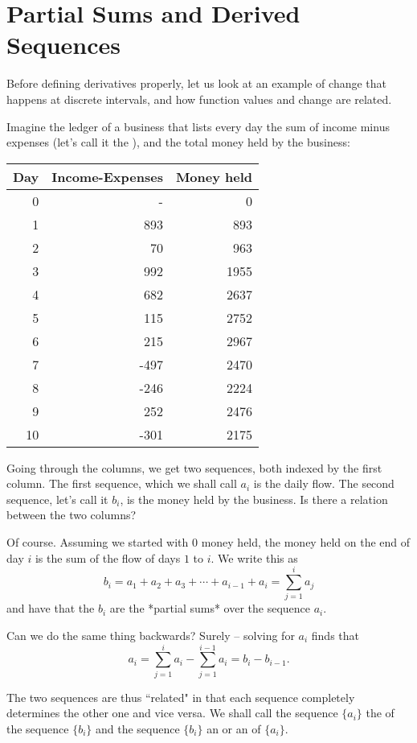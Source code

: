 \section{Partial Sums and Derived Sequences}

Before defining derivatives properly, let us look at an example of change
that happens at discrete intervals, and how function values and change are
related.


Imagine
the ledger of a business that lists every day the sum of income minus expenses
(let's call it the ), and the total money held by the business:

\begin{center}
\begin{tabular}{rrr}
Day&Income-Expenses&Money held\\
\hline
0& - &0\\
1&893&893\\
2&70&963\\
3&992&1955\\
4&682&2637\\
5&115&2752\\
6&215&2967\\
7&-497&2470\\
8&-246&2224\\
9&252&2476\\
10&-301&2175\\
\end{tabular}
\end{center}

Going through the columns, we get two sequences, both indexed by the first
column.  The first sequence, which we shall call $a_i$ is the daily flow.
The second sequence, let's call it $b_i$, is the money held by the business.
Is there a relation between the two columns?

Of course. Assuming we started with $0$ money held, the money held on the end of day
$i$ is the sum of the flow of days $1$ to $i$. We write this as
$$b_i=a_1+a_2+a_3+\cdots+ a_{i-1}+a_i=\sum_{j=1}^i a_j$$
and have that the $b_i$ are the *partial sums* over the sequence $a_i$.

Can we do the same thing backwards? Surely -- solving for $a_i$ finds that
$$a_i=\sum_{j=1}^ia_i-\sum_{j=1}^{i-1}a_i=b_i-b_{i-1}.$$

The two sequences are thus ``related" in that each sequence completely
determines the other one and vice versa. We shall call the sequence $\{a_i\}$
the  of the sequence $\{b_i\}$ and the sequence
$\{b_i\}$ 
an  or an
 of $\{a_i\}$.

